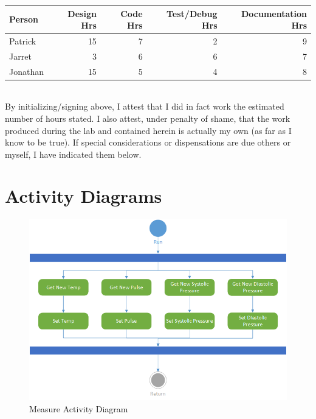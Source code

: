 \documentclass[12pt]{article} %
\begin{document}
\begin{tabular}{|l|*{4}{r|}}
	\hline
	Person & Design Hrs & Code Hrs & Test/Debug Hrs & Documentation Hrs \\ \hline
	Patrick & 15 & 7 & 2 & 9  \\ \hline
	Jarret & 3 & 6 & 6 & 7  \\ \hline
	Jonathan & 15 & 5 & 4 & 8  \\ \hline
\end{tabular}

~\\

By initializing/signing above, I attest that I did in fact work the estimated number of hours stated. I also attest, under penalty of shame, that the work produced during the lab and contained herein is actually my own (as far as I know to be true). If special considerations or dispensations are due others or myself, I have indicated them below.

\pagebreak

\section{Activity Diagrams}

\begin{figure}
  \centering
  \includegraphics[width=\textwidth]{../design/measure_activity.png}
  \caption{Measure Activity Diagram}
  \label{fig:measureActivity}
\end{figure}
\end{document}
